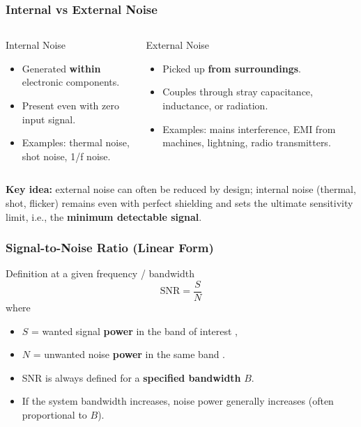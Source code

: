 \begin{frame}
	\frametitle{Internal vs External Noise}
	\begin{columns}[T,onlytextwidth]
			\begin{block}{Internal Noise}
				\begin{itemize}
					\item Generated \textbf{within} electronic components.
					\item Present even with zero input signal.
					\item Examples: thermal noise, shot noise, 1/f noise.
				\end{itemize}
			\end{block}
			\begin{block}{External Noise}
				\begin{itemize}
					\item Picked up \textbf{from surroundings}.
					\item Couples through stray capacitance, inductance, or radiation.
					\item Examples: mains interference, EMI from machines, lightning, radio transmitters.
				\end{itemize}
			\end{block}
	\end{columns}
	\vspace{0.2cm}
	\textbf{Key idea:} external noise can often be reduced by design; internal noise (thermal, shot, flicker) remains even with perfect shielding and sets the ultimate sensitivity limit, i.e., the \textbf{minimum detectable signal}.
\end{frame}

\begin{frame}
	\frametitle{Signal-to-Noise Ratio (Linear Form)}
	\begin{block}{Definition at a given frequency / bandwidth}
		\begin{equation}
			\mathrm{SNR} = \frac{S}{N}
		\end{equation}
		where
		\begin{itemize}
			\item $S$ = wanted signal \textbf{power} in the band of interest \;[\unit{W}],
			\item $N$ = unwanted noise \textbf{power} in the same band \;[\unit{W}].
		\end{itemize}
	\end{block}
	\begin{itemize}
		\item SNR is always defined for a \textbf{specified bandwidth} $B$.
		\item If the system bandwidth increases, noise power generally increases (often proportional to $B$).
	\end{itemize}
\end{frame}

